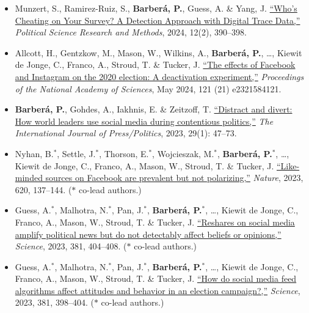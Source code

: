\documentclass[margin,line,11pt]{resume}
\begin{document}
\begin{resume}
\begin{itemize}[leftmargin=5.5mm]
\item[32.] Munzert, S., Ramirez-Ruiz, S., \textbf{Barber\'{a}, P.}, Guess, A. \& Yang, J. \href{https://www.cambridge.org/core/journals/political-science-research-and-methods/article/abs/whos-cheating-on-your-survey-a-detection-approach-with-digital-trace-data/115692ADAE92807490B3E02FDA306598}{``Who's Cheating on Your Survey? A Detection Approach with Digital Trace Data,''} \textit{Political Science Research and Methods}, 2024, 12(2), 390--398.

\item[31.] Allcott, H., Gentzkow, M., Mason, W., Wilkins, A., \textbf{Barber\'{a}, P.}, \ldots, Kiewit de Jonge, C., Franco, A., Stroud, T. \& Tucker, J. \href{https://www.pnas.org/doi/10.1073/pnas.2321584121}{``The effects of Facebook and Instagram on the 2020 election: A deactivation experiment,''} \textit{Proceedings of the National Academy of Sciences}, May 2024, 121 (21) e2321584121.

\item[30.] \textbf{Barber\'{a}, P.}, Gohdes, A., Iakhnis, E. \& Zeitzoff, T. \href{https://journals.sagepub.com/doi/abs/10.1177/19401612221102030}{``Distract and divert: How world leaders use social media during contentious politics,''} \textit{The International Journal of Press/Politics}, 2023, 29(1): 47–73.

\item[29.] Nyhan, B.$^\ast$, Settle, J.$^\ast$, Thorson, E.$^\ast$, Wojcieszak, M.$^\ast$,  \textbf{Barber\'{a}, P.$^\ast$}, \ldots, Kiewit de Jonge, C., Franco, A., Mason, W., Stroud, T. \& Tucker, J. \href{https://www.nature.com/articles/s41586-023-06297-w}{``Like-minded sources on Facebook are prevalent but not polarizing,''} \textit{Nature}, 2023, 620, 137--144.  ($\ast$ co-lead authors.)

\item[28.] Guess, A.$^\ast$, Malhotra, N.$^\ast$, Pan, J.$^\ast$, \textbf{Barber\'{a}, P.$^\ast$}, \ldots, Kiewit de Jonge, C., Franco, A., Mason, W., Stroud, T. \& Tucker, J. \href{https://www.science.org/doi/10.1126/science.add8424}{``Reshares on social media amplify political news but do not detectably affect beliefs or opinions,''} \textit{Science}, 2023, 381, 404--408.  ($\ast$ co-lead authors.)

\item[27.] Guess, A.$^\ast$, Malhotra, N.$^\ast$, Pan, J.$^\ast$, \textbf{Barber\'{a}, P.$^\ast$}, \ldots, Kiewit de Jonge, C., Franco, A., Mason, W., Stroud, T. \& Tucker, J. \href{https://www.science.org/doi/10.1126/science.abp9364}{``How do social media feed algorithms affect attitudes and behavior in an election campaign?,''} \textit{Science}, 2023, 381, 398--404. ($\ast$ co-lead authors.)


\end{itemize}
\end{resume}
\end{document}
